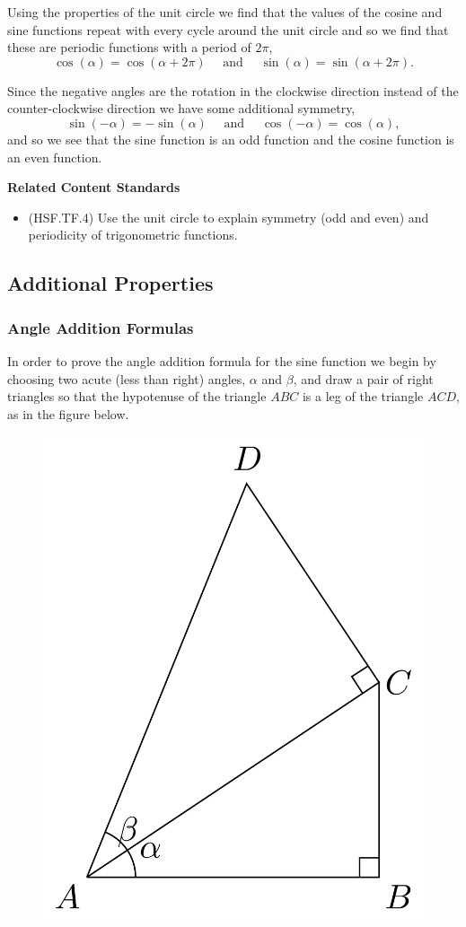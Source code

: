 \documentclass[
]{book}
\providecommand{\tightlist}{%
  \setlength{\itemsep}{0pt}\setlength{\parskip}{0pt}}
\newenvironment{standards}{}{}
\theoremstyle{definition}
\theoremstyle{definition}
\theoremstyle{definition}
\theoremstyle{definition}
\theoremstyle{remark}
\begin{document}
Using the properties of the unit circle we find that the values of the cosine and sine functions repeat with every cycle around the unit circle and so we find that these are periodic functions with a period of \(2\pi\),
\[\cos(\alpha) = \cos (\alpha+2\pi) \quad \mbox{ and } \quad \sin(\alpha) = \sin(\alpha+2\pi).\]

Since the negative angles are the rotation in the clockwise direction instead of the counter-clockwise direction we have some additional symmetry,
\[\sin(-\alpha)=-\sin(\alpha) \quad \mbox{ and } \quad \cos(-\alpha) = \cos(\alpha),\]
and so we see that the sine function is an odd function and the cosine function is an even function.

\begin{standards}

\begin{center}
\textbf{Related Content Standards}

\end{center}

\begin{itemize}
\tightlist
\item
  (HSF.TF.4) Use the unit circle to explain symmetry (odd and even) and periodicity of trigonometric functions.
\end{itemize}

\end{standards}

\hypertarget{additional-properties}{%
\subsection{Additional Properties}\label{additional-properties}}

\hypertarget{angle-addition-formulas}{%
\subsubsection{Angle Addition Formulas}\label{angle-addition-formulas}}

In order to prove the angle addition formula for the sine function we begin by choosing two acute (less than right) angles, \(\alpha\) and \(\beta\), and draw a pair of right triangles so that the hypotenuse of the triangle \(ABC\) is a leg of the triangle \(ACD\), as in the figure below.

\begin{figure}

{\centering \includegraphics[width=0.3\linewidth]{tikz/angle-addition-sine1} 

}

\end{figure}
\end{document}
